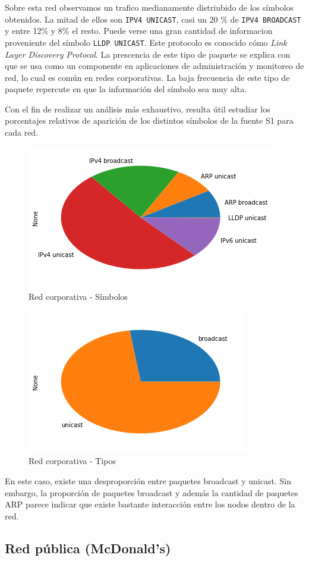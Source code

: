 Sobre esta red observamos un trafico medianamente distriubido de los símbolos obtenidos. La mitad de ellos son \texttt{IPV4 UNICAST}, casi un 20 \% de \texttt{IPV4 BROADCAST} y entre 12\% y 8\% el resto. Puede verse una gran cantidad de informacion proveniente del símbolo \texttt{LLDP UNICAST}. Este protocolo es conocido cómo \textit{Link Layer Discovery Protocol}. La prescencia de este tipo de paquete se explica con que se usa como un componente en aplicaciones de administración y monitoreo de red, lo cual es común en redes corporativas. La baja frecuencia de este tipo de paquete repercute en que la información del símbolo sea muy alta.

Con el fin de realizar un análisis más exhaustivo, resulta útil estudiar los porcentajes relativos de aparición de los distintos símbolos de la fuente S1 para cada red.

\begin{figure}[H]
	\centering
	\includegraphics[width=.5\linewidth]{imagenes/despegar_torta_simbolos}
	\caption{Red corporativa - Símbolos}
\end{figure}

\begin{figure}[H]
	\centering
	\includegraphics[width=.5\linewidth]{imagenes/despegar_torta_tipos}
	\caption{Red corporativa - Tipos}
\end{figure}

En este caso, existe una desproporción entre paquetes broadcast y unicast. Sin embargo, la proporción de paquetes broadcast y además la cantidad de paquetes ARP parece indicar que existe bastante interacción entre los nodos dentro de la red.

\subsection{Red pública (McDonald's)}

